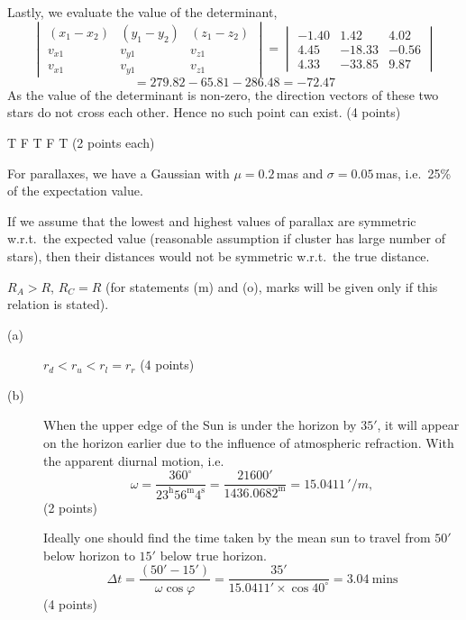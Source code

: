 \begin{description}
  Lastly, we evaluate the value of the determinant,
  \[ \begin{vmatrix}
     (x_1 - x_2) & (y_1 - y_2) & (z_1 - z_2)\\
     v_{x1} & v_{y1} & v_{z1}\\
     v_{x1} & v_{y1} & v_{z1}
     \end{vmatrix}
   = \begin{vmatrix}
     -1.40 & 1.42 & 4.02\\
     4.45 & -18.33 & -0.56\\
     4.33 & -33.85 & 9.87
     \end{vmatrix} \]
  \[ = 279.82 - 65.81 - 286.48 = -72.47 \]
  As the value of the determinant is non-zero, the direction vectors of
  these two stars do not cross each other. Hence no such point can exist.
  \hfill(4 points)
\end{description}

T F T F T \hfill(2 points each)

For parallaxes, we have a Gaussian with $\mu = 0.2$\,mas and
$\sigma = 0.05$\,mas, i.e.\ 25\% of the expectation value.

If we assume that the lowest and highest values of parallax are symmetric
w.r.t.\ the expected value (reasonable assumption if cluster has large
number of stars), then their distances would not be symmetric w.r.t.\ the
true distance.

$R_A > R$, $R_C = R$ (for statements (m) and (o), marks will be given only
if this relation is stated).

\begin{description}
\item[(a)] $r_d < r_u < r_l = r_r$ \hfill(4 points)
\item[(b)] When the upper edge of the Sun is under the horizon by $35'$, it
  will appear on the horizon earlier due to the influence of atmospheric
  refraction. With the apparent diurnal motion, i.e.
  \[ \omega = \frac{360^\circ}{23^{\mathrm{h}}56^{\mathrm{m}}4^{\mathrm{s}}}
     = \frac{21600'}{1436.0682^{\mathrm{m}}} = 15.0411\,'/m, \]
  \hfill(2 points)

  Ideally one should find the time taken by the mean sun to travel from
  $50'$ below horizon to $15'$ below true horizon.
  \[ \Delta t = \frac{(50' - 15')}{\omega\cos\varphi}
     = \frac{35'}{15.0411'\times\cos 40^\circ} = 3.04\ \mathrm{mins} \]
  \hfill(4 points)
\end{description}

